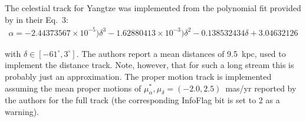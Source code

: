The celestial track for Yangtze was implemented from the polynomial fit provided by \citet{Yang2023b} in their Eq.~3:
\begin{eqnarray*}
\alpha = -2.44373567\times10^{-5})\delta^3 -1.62880413\times10^{-3})\delta^2  - 0.138532434\delta + 3.04632126
\end{eqnarray*}

with $\delta \in [-61^\circ,3^\circ]$. The authors report a mean distances of 9.5~kpc, used to implement the distance track.
Note, however, that for such a long stream this is probably just an approximation. 
The proper motion track is implemented assuming the mean proper motions of $\mu_\alpha^*,\mu_\delta=(-2.0,2.5)$~mas/yr reported by the authors for the full track (the corresponding InfoFlag bit is set to 2 as a warning). 
